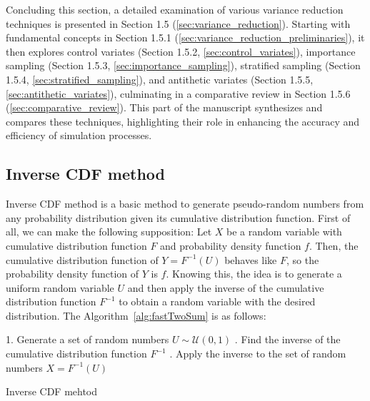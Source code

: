 \documentclass{article}
\begin{document}
Concluding this section, a detailed examination of various variance reduction techniques is presented in Section 1.5 (\ref{sec:variance_reduction}). Starting with fundamental concepts in Section 1.5.1 (\ref{sec:variance_reduction_preliminaries}), it then explores control variates (Section 1.5.2, \ref{sec:control_variates}), importance sampling (Section 1.5.3, \ref{sec:importance_sampling}), stratified sampling (Section 1.5.4, \ref{sec:stratified_sampling}), and antithetic variates (Section 1.5.5, \ref{sec:antithetic_variates}), culminating in a comparative review in Section 1.5.6 (\ref{sec:comparative_review}). This part of the manuscript synthesizes and compares these techniques, highlighting their role in enhancing the accuracy and efficiency of simulation processes.

\subsection{Inverse CDF method}
\label{sec:inverse_cdf}

Inverse CDF method is a basic method to generate pseudo-random numbers from any probability distribution given its cumulative distribution function. First of all, we can make the following supposition: Let \(X\) be a random variable with cumulative distribution function \(F\) and probability density function \(f\). Then, the cumulative distribution function of \(Y = F^{-1}(U)\) behaves like \(F\), so the probability density function of \(Y\) is \(f\). Knowing this, the idea is to generate a uniform random variable \(U\) and then apply the inverse of the cumulative distribution function \(F^{-1}\) to obtain a random variable with the desired distribution. The Algorithm~\ref{alg:fastTwoSum} is as follows:

\begin{center}
	\begin{minipage}{0.7\linewidth} %
		\begin{algorithm}[H]
			1. Generate a set of random numbers \(U \sim \mathcal{U}(0,1)\) . Find the inverse of the cumulative distribution function \(F^{-1}\) . Apply the inverse to the set of random numbers \(X = F^{-1}(U)\) \;
			\caption{Inverse CDF mehtod} %
			\label{alg:fastTwoSum}   %
		\end{algorithm}
	\end{minipage}
\end{center}
\end{document}
